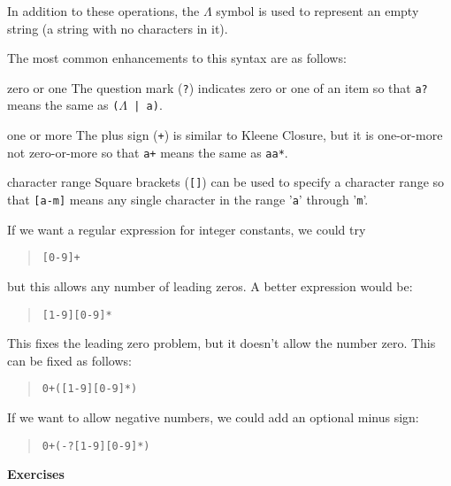\documentclass[letterpaper,12pt,openany,reqno]{book}%
\newenvironment{mydesc}[1][9em]
  {
     \begin{basedescript}
     {
      \renewcommand{\makelabel}[1]{\bfseries##1}
      \desclabelwidth{ #1 }
      \desclabelstyle{\multilinelabel}
     }
  }
  {
     \end{basedescript}%
  }
\begin{document}
In addition to these operations, the $\Lambda$ symbol is used to represent an empty string (a string with no characters in it).

The most common enhancements to this syntax are as follows:
\begin{mydesc}
\item[zero or one] The question mark (\texttt{?}) indicates zero or one of an item so that \texttt{a?} means the same as \texttt{($\Lambda$ | a)}.
\item[one or more] The plus sign (\texttt{+}) is similar to Kleene Closure, but it is one-or-more not zero-or-more so that \texttt{a+} means the same as \texttt{aa*}.
\item[character range] Square brackets (\texttt{[]}) can be used to specify a character range so that \texttt{[a-m]} means any single character in the range '\texttt{a}' through '\texttt{m}'.
\end{mydesc}

If we want a regular expression for integer constants, we could try
\begin{quote}\texttt{[0-9]+}\end{quote}
but this allows any number of leading zeros. A better expression would be:
\begin{quote}\texttt{[1-9][0-9]*}\end{quote}
This fixes the leading zero problem, but it doesn't allow the number zero. This can be fixed as follows:
\begin{quote}\texttt{0+([1-9][0-9]*)}\end{quote}
If we want to allow negative numbers, we could add an optional minus sign:
\begin{quote}\texttt{0+(-?[1-9][0-9]*)}\end{quote}

\textbf{Exercises}
\end{document}
